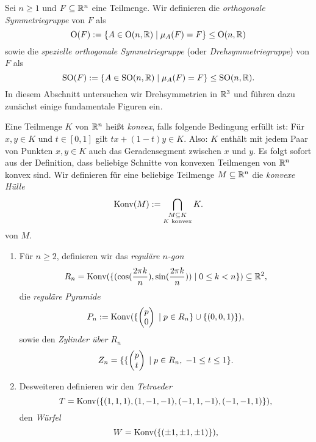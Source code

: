 \documentclass{book}
\begin{document}
Sei $n \ge 1$ und $F \subseteq \mathbb{R}^n$ eine Teilmenge. Wir definieren die {\em orthogonale Symmetriegruppe} von $F$ als
\[
    \operatorname{O}(F) :=  \{ A \in \operatorname{O}(n,\mathbb{R})\; | \; \mu_A(F) = F \} \le \operatorname{O}(n,\mathbb{R})
\]
sowie die {\em spezielle orthogonale Symmetriegruppe} (oder {\em Drehsymmetriegruppe}) von $F$ als 
\[
    \operatorname{SO}(F) :=  \{ A \in \operatorname{SO}(n,\mathbb{R})\; | \; \mu_A(F) = F \} \le \operatorname{SO}(n,\mathbb{R}).
\]
In diesem Abschnitt untersuchen wir Drehsymmetrien in $\mathbb{R}^3$ und führen dazu
zunächst einige fundamentale Figuren ein. 

\begin{exas} 
    \label{exas:figuren}
    Eine Teilmenge $K$ von $\mathbb{R}^n$ heißt {\em konvex}, falls folgende Bedingung
    erfüllt ist: Für $x,y \in K$ und $t \in [0,1]$ gilt $t x + (1-t) y \in K$. 
    Also: $K$ enthält mit jedem Paar von Punkten $x,y \in K$ auch das
    Geradensegment zwischen $x$ und $y$. Es folgt sofort aus der Definition,
    dass beliebige Schnitte von konvexen Teilmengen von $\mathbb{R}^n$ konvex sind.
    Wir definieren für eine beliebige Teilmenge $M \subseteq \mathbb{R}^n$ die {\em
        konvexe Hülle}
    \[
        \operatorname{Konv}(M) := \bigcap_{\substack{M \subseteq K\\ \text{$K$ konvex}}} K.
    \]
    von $M$.
    \begin{enumerate}
        \item Für $n \ge 2$, definieren wir das {\em reguläre $n$-gon}
            \[
                R_n = \operatorname{Konv}(\{(\cos(\frac{2 \pi k}{n}), \sin(\frac{2 \pi k}{n}))\; |\; 0 \le k < n \}) \subseteq \mathbb{R}^2,
            \]
            die {\em reguläre Pyramide}
            \[
                P_n := \operatorname{Konv}(\{\begin{pmatrix}  p \\ 0  \end{pmatrix}\; |\;p \in R_n \} \cup \{(0,0,1)\}),
            \]
            sowie den {\em Zylinder über $R_n$}
            \[
                Z_n = \{\{\begin{pmatrix}  p \\ t  \end{pmatrix} \; |\; p \in R_n ,\; -1 \le t \le 1 \}.
            \]
        \item Desweiteren definieren wir den {\em Tetraeder}
            \[
                T = \operatorname{Konv}(\{(1,1,1),(1,-1,-1),(-1,1,-1),(-1,-1,1)\}),
            \]
            den {\em Würfel}
            \[
                W = \operatorname{Konv}(\{ ( \pm 1, \pm 1, \pm 1) \}),
\]
\end{enumerate}
\end{exas}
\end{document}
